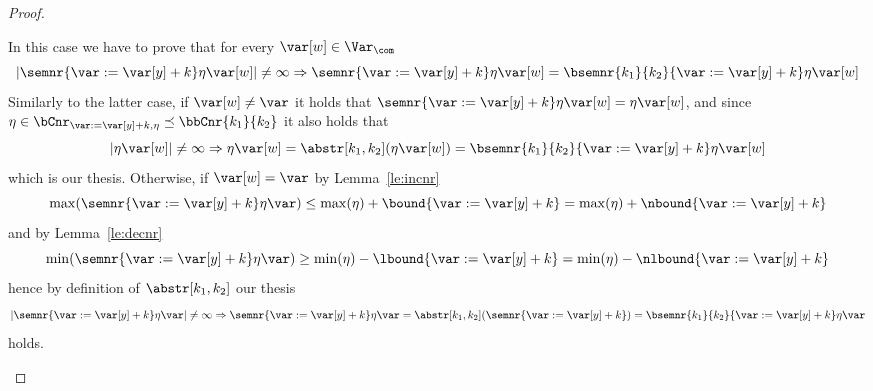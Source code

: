 \begin{proof}
\begin{inductive}
     In this case we have to prove that
    for every \(\var[w] \in \Var_{\com}\)
    \begin{equation*}
      |{\semnr{\var := \var[y] + k}\eta\var[w]}| \neq \infty
      \Rightarrow
      {\semnr{\var := \var[y] + k}\eta\var[w]} = {\bsemnr{k_1}{k_2}{\var := \var[y] + k}\eta\var[w]}
    \end{equation*}
    Similarly to the latter case, if \(\var[w] \neq \var\) it holds
    that \(\semnr{\var := \var[y] + k}\eta\var[w] = \eta\var[w]\), and
    since
    \(\eta \in \bCnr_{\var := \var[y] + k, \eta} \preceq
    \bbCnr{k_1}{k_2}\) it also holds that
    \begin{equation*}
      |\eta\var[w]| \neq \infty \Rightarrow \eta\var[w] = \abstr[k_1,k_2](\eta\var[w]) = \bsemnr{k_1}{k_2}{\var := \var[y] + k}\eta\var[w]
    \end{equation*}
    which is our thesis. Otherwise, if \(\var[w] = \var\) by
    Lemma~\ref{le:incnr}
    \begin{equation*}
      \max(\semnr{\var := \var[y] + k}\eta\var) \leq \max(\eta) +
      \bound{\var := \var[y] + k} = \max(\eta) + \nbound{\var := \var[y]
        + k}
    \end{equation*}
    and by Lemma~\ref{le:decnr} 
    \begin{equation*}
      \min(\semnr{\var := \var[y] + k}\eta\var) \geq \min(\eta) -
      \lbound{\var := \var[y] + k} = \min(\eta) - \nlbound{\var := \var[y]
        + k}
    \end{equation*}
    hence by definition of \(\abstr[k_1,k_2]\) our thesis
    \begin{equation*}
      |\semnr{\var := \var[y] + k}\eta\var| \neq \infty \Rightarrow
      \semnr{\var := \var[y] + k}\eta\var =
      \abstr[k_1,k_2](\semnr{\var := \var[y] + k}) =
      \bsemnr{k_1}{k_2}{\var := \var[y] + k}\eta\var
    \end{equation*}
    holds.


\end{inductive}
\end{proof}
